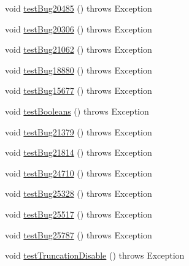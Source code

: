 \begin{DoxyCompactItemize}
\item 
void \mbox{\hyperlink{classtestsuite_1_1regression_1_1_result_set_regression_test_a5e674e0b217a2731be3be70fa79f0007}{test\+Bug20485}} ()  throws Exception 
\item 
void \mbox{\hyperlink{classtestsuite_1_1regression_1_1_result_set_regression_test_a676f6934dd6986c57deb1da3920d7240}{test\+Bug20306}} ()  throws Exception 
\item 
void \mbox{\hyperlink{classtestsuite_1_1regression_1_1_result_set_regression_test_a18bcdff4c2c8f2245a2e5bb6696e2506}{test\+Bug21062}} ()  throws Exception 
\item 
void \mbox{\hyperlink{classtestsuite_1_1regression_1_1_result_set_regression_test_a12e0f87612792e99392825bcd4cb8711}{test\+Bug18880}} ()  throws Exception 
\item 
void \mbox{\hyperlink{classtestsuite_1_1regression_1_1_result_set_regression_test_af586d3a65d3b053faa5dd5da4cd5cb15}{test\+Bug15677}} ()  throws Exception 
\item 
void \mbox{\hyperlink{classtestsuite_1_1regression_1_1_result_set_regression_test_ad371e7e2f3ccd917443053e73542439d}{test\+Booleans}} ()  throws Exception 
\item 
void \mbox{\hyperlink{classtestsuite_1_1regression_1_1_result_set_regression_test_a0e70ddab19727d4cb909e12706e43cff}{test\+Bug21379}} ()  throws Exception 
\item 
void \mbox{\hyperlink{classtestsuite_1_1regression_1_1_result_set_regression_test_a13c63c3fff5de437e9d908260d7edff8}{test\+Bug21814}} ()  throws Exception 
\item 
void \mbox{\hyperlink{classtestsuite_1_1regression_1_1_result_set_regression_test_a5ac3cc852f40725510fa770bc496ae90}{test\+Bug24710}} ()  throws Exception 
\item 
void \mbox{\hyperlink{classtestsuite_1_1regression_1_1_result_set_regression_test_a6186125e90deee1db033aeb3cfe20a47}{test\+Bug25328}} ()  throws Exception 
\item 
void \mbox{\hyperlink{classtestsuite_1_1regression_1_1_result_set_regression_test_a70caaccac8b8006475747f9481a529af}{test\+Bug25517}} ()  throws Exception 
\item 
void \mbox{\hyperlink{classtestsuite_1_1regression_1_1_result_set_regression_test_ac301a606f76010d277f5daf49e296b01}{test\+Bug25787}} ()  throws Exception 
\item 
void \mbox{\hyperlink{classtestsuite_1_1regression_1_1_result_set_regression_test_ad69ed75a3e108acae96519abfdfd6de6}{test\+Truncation\+Disable}} ()  throws Exception 

\end{DoxyCompactItemize}
